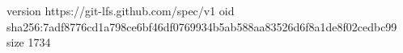 version https://git-lfs.github.com/spec/v1
oid sha256:7adf8776cd1a798ce6bf46df0769934b5ab588aa83526d6f8a1de8f02cedbc99
size 1734
